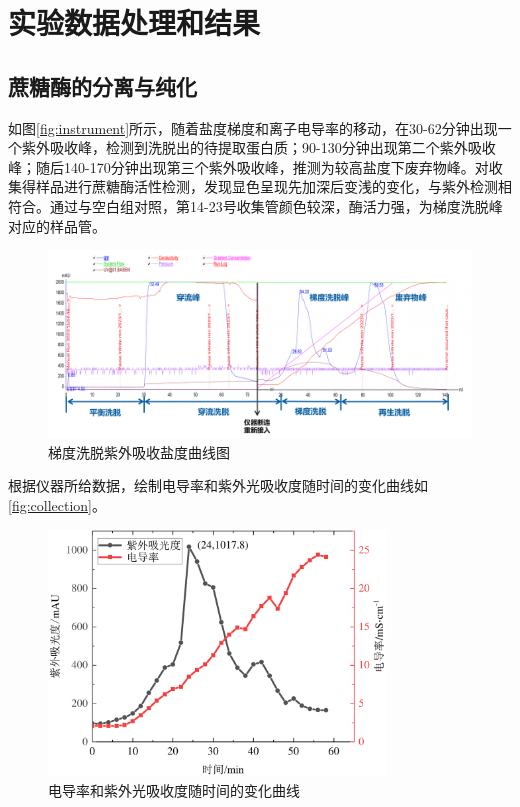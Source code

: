 \section{实验数据处理和结果}

\subsection{蔗糖酶的分离与纯化}
 \par 如图\autoref{fig:instrument}所示，随着盐度梯度和离子电导率的移动，在30-62分钟出现一个紫外吸收峰，检测到洗脱出的待提取蛋白质；90-130分钟出现第二个紫外吸收峰；随后140-170分钟出现第三个紫外吸收峰，推测为较高盐度下废弃物峰。对收集得样品进行蔗糖酶活性检测，发现显色呈现先加深后变浅的变化，与紫外检测相符合。通过与空白组对照，第14-23号收集管颜色较深，酶活力强，为梯度洗脱峰对应的样品管。
\begin{figure}[H]
    \centering
    \includegraphics[width = \textwidth]{figure/curves/instrument.png}
    \caption{梯度洗脱紫外吸收盐度曲线图}
    \label{fig:instrument}
\end{figure}
根据仪器所给数据，绘制电导率和紫外光吸收度随时间的变化曲线如\autoref{fig:collection}。

\begin{figure}[H]
    \centering
    \includegraphics[width = 0.8\textwidth]{figure/curves/collections_MM.pdf}
    \caption{电导率和紫外光吸收度随时间的变化曲线}
    \label{fig:collection}
\end{figure}


